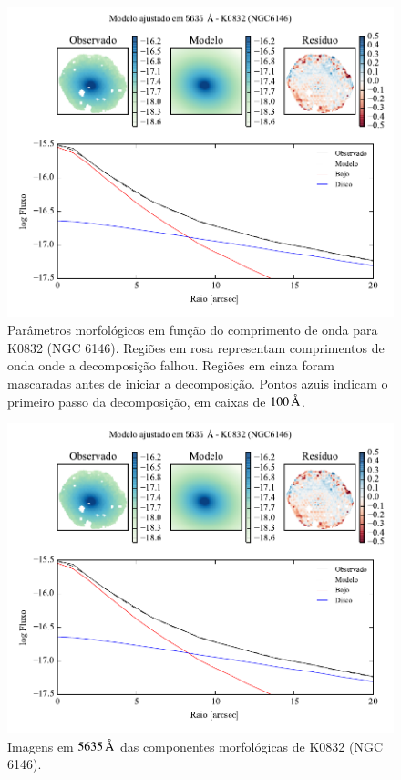 \begin{figure}
	\includegraphics[page=2]{figuras-decomp/K0832_sample006a}
	\caption[Parâmetros morfológicos em função do comprimento de onda de K0832
	(NGC 6146)]
	{Parâmetros morfológicos em função do comprimento de onda para
	K0832 (NGC 6146). Regiões em rosa representam comprimentos de onda onde a
	decomposição falhou. Regiões em cinza foram mascaradas antes de iniciar a
	decomposição. Pontos azuis indicam o primeiro passo da decomposição, em caixas
	de $100\,\text{\normalfont\AA}$.}
	\label{fig:decompParams:K0832}
\end{figure}

\begin{figure}
	\includegraphics[page=3]{figuras-decomp/K0832_sample006a}
	\caption[Imagens em $5635\,\angstrom$ das componentes morfológicas de K0832
	(NGC 6146)]
	{Imagens em $5635\,\angstrom$ das componentes morfológicas de K0832
	(NGC 6146).}
	\label{fig:decompImages:K0832}
\end{figure}

